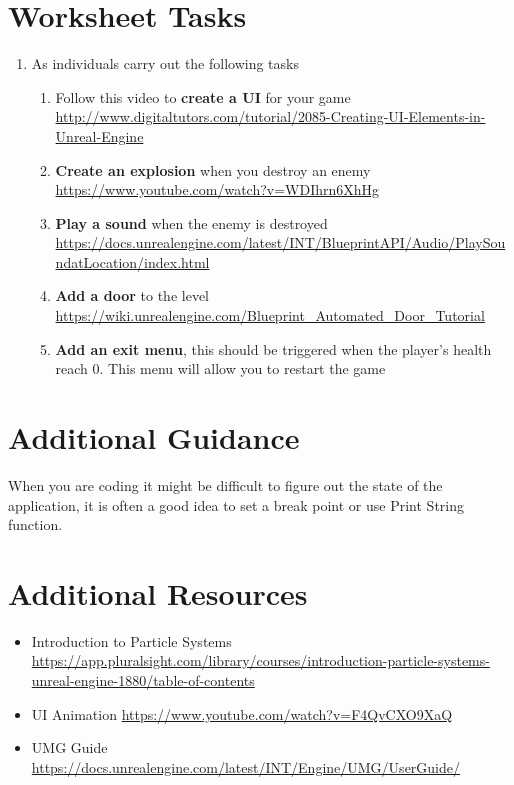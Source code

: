 \documentclass{../../../fal_assignment}
\begin{document}
\section*{Worksheet Tasks}

\begin{enumerate}
	\item As individuals carry out the following tasks
  	\begin{enumerate}[label=(\Alph*)]
      \item Follow this video to \textbf{create a UI} for your game \url{http://www.digitaltutors.com/tutorial/2085-Creating-UI-Elements-in-Unreal-Engine}
      \item \textbf{Create an explosion} when you destroy an enemy \url{https://www.youtube.com/watch?v=WDIhrn6XhHg}
      \item \textbf{Play a sound} when the enemy is destroyed \url{https://docs.unrealengine.com/latest/INT/BlueprintAPI/Audio/PlaySoundatLocation/index.html}
      \item \textbf{Add a door} to the level \url{https://wiki.unrealengine.com/Blueprint_Automated_Door_Tutorial}
      \item \textbf{Add an exit menu}, this should be triggered when the player's health reach 0. This menu will allow you to restart the game
    \end{enumerate}
\end{enumerate}

\section*{Additional Guidance}
When you are coding it might be difficult to figure out the state of the application, it is often a good idea to set a break point or use Print String function.


\section*{Additional Resources}

\begin{itemize}
  \item Introduction to Particle Systems \url{https://app.pluralsight.com/library/courses/introduction-particle-systems-unreal-engine-1880/table-of-contents}
  \item UI Animation \url{https://www.youtube.com/watch?v=F4QvCXO9XaQ}
  \item UMG Guide \url{https://docs.unrealengine.com/latest/INT/Engine/UMG/UserGuide/}
\end{itemize}
\end{document}

